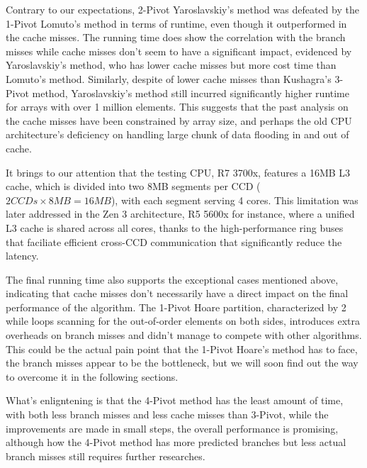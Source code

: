 \documentclass{article}
\newcommand{\bigO}{\mathcal{O}}
\begin{document}

Contrary to our expectations, 2-Pivot Yaroslavskiy's method was defeated by the 1-Pivot Lomuto's method in terms of runtime, even though it outperformed in the cache misses.
The running time does show the correlation with the branch misses while cache misses don't seem to have a significant impact, evidenced by Yaroslavskiy's method, who has lower cache misses but more cost time than Lomuto's method.
Similarly, despite of lower cache misses than Kushagra's 3-Pivot method, Yaroslavskiy's method still incurred significantly higher runtime for arrays with over 1 million elements.
This suggests that the past analysis on the cache misses have been constrained by array size, and perhaps the old CPU architecture's deficiency on handling large chunk of data flooding in and out of cache.

It brings to our attention that the testing CPU, R7 3700x, features a 16MB L3 cache, which is divided into two 8MB segments per CCD ($2 CCDs \times 8MB = 16MB$), with each segment serving 4 cores.
This limitation was later addressed in the Zen 3 architecture, R5 5600x for instance, where a unified L3 cache is shared across all cores, thanks to the high-performance ring buses that faciliate efficient cross-CCD communication that significantly reduce the latency.

The final running time also supports the exceptional cases mentioned above, indicating that cache misses don't necessarily have a direct impact on the final performance of the algorithm.
The 1-Pivot Hoare partition, characterized by 2 while loops scanning for the out-of-order elements on both sides, introduces extra overheads on branch misses and didn't manage to compete with other algorithms.
This could be the actual pain point that the 1-Pivot Hoare's method has to face, the branch misses appear to be the bottleneck, but we will soon find out the way to overcome it in the following sections.

What's enligntening is that the 4-Pivot method has the least amount of time, with both less branch misses and less cache misses than 3-Pivot, while the improvements are made in small steps, the overall performance is promising,
although how the 4-Pivot method has more predicted branches but less actual branch misses still requires further researches.
\end{document}

